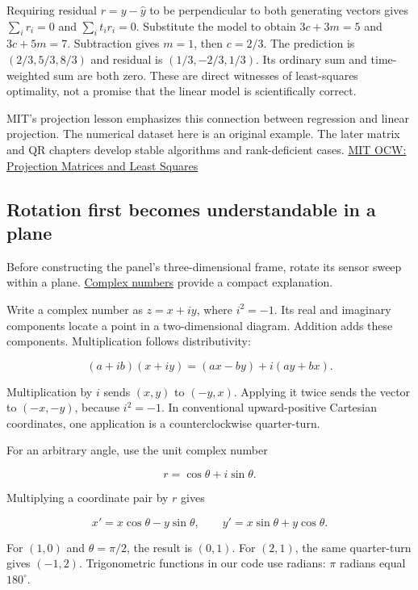 Requiring residual \(r=y-\widehat y\) to be perpendicular to both generating vectors gives \(\sum_i r_i=0\) and \(\sum_i t_ir_i=0\). Substitute the model to obtain \(3c+3m=5\) and \(3c+5m=7\). Subtraction gives \(m=1\), then \(c=2/3\). The prediction is \((2/3,5/3,8/3)\) and residual is \((1/3,-2/3,1/3)\). Its ordinary sum and time-weighted sum are both zero. These are direct witnesses of least-squares optimality, not a promise that the linear model is scientifically correct.

MIT's projection lesson emphasizes this connection between regression and linear projection. The numerical dataset here is an original example. The later matrix and QR chapters develop stable algorithms and rank-deficient cases. \href{https://www.ocw.mit.edu/courses/18-06sc-linear-algebra-fall-2011/pages/least-squares-determinants-and-eigenvalues/projection-matrices-and-least-squares/}{MIT OCW: Projection Matrices and Least Squares}

\subsection{Rotation first becomes understandable in a plane}\label{rotation-first-becomes-understandable-in-a-plane}

Before constructing the panel's three-dimensional frame, rotate its sensor sweep within a plane. \hyperref[01-foundations-i-ch017]{Complex numbers} provide a compact explanation.

Write a complex number as \(z=x+iy\), where \(i^2=-1\). Its real and imaginary components locate a point in a two-dimensional diagram. Addition adds these components. Multiplication follows distributivity:

\[
(a+ib)(x+iy)=(ax-by)+i(ay+bx).
\]

Multiplication by \(i\) sends \((x,y)\) to \((-y,x)\). Applying it twice sends the vector to \((-x,-y)\), because \(i^2=-1\). In conventional upward-positive Cartesian coordinates, one application is a counterclockwise quarter-turn.

For an arbitrary angle, use the unit complex number

\[
r=\cos\theta+i\sin\theta.
\]

Multiplying a coordinate pair by \(r\) gives

\[
x'=x\cos\theta-y\sin\theta,\qquad
y'=x\sin\theta+y\cos\theta.
\]

For \((1,0)\) and \(\theta=\pi/2\), the result is \((0,1)\). For \((2,1)\), the same quarter-turn gives \((-1,2)\). Trigonometric functions in our code use radians: \(\pi\) radians equal \(180^\circ\).

